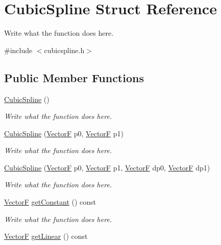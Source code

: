\hypertarget{structCubicSpline}{\section{Cubic\+Spline Struct Reference}
\label{structCubicSpline}
}


Write what the function does here.  




{\ttfamily \#include $<$cubicspline.\+h$>$}

\subsection*{Public Member Functions}
\begin{DoxyCompactItemize}
\item 
\hyperlink{structCubicSpline_a3eee74ae159c9473a6d15512ddc68d25}{Cubic\+Spline} ()
\begin{DoxyCompactList}\small\item\em Write what the function does here. \end{DoxyCompactList}\item 
\hyperlink{structCubicSpline_ae9889650db27305852f896d03d3bd75c}{Cubic\+Spline} (\hyperlink{structVectorF}{Vector\+F} p0, \hyperlink{structVectorF}{Vector\+F} p1)
\begin{DoxyCompactList}\small\item\em Write what the function does here. \end{DoxyCompactList}\item 
\hyperlink{structCubicSpline_a661fd0aed3df6744f52f5ba3872b9251}{Cubic\+Spline} (\hyperlink{structVectorF}{Vector\+F} p0, \hyperlink{structVectorF}{Vector\+F} p1, \hyperlink{structVectorF}{Vector\+F} dp0, \hyperlink{structVectorF}{Vector\+F} dp1)
\begin{DoxyCompactList}\small\item\em Write what the function does here. \end{DoxyCompactList}\item 
\hyperlink{structVectorF}{Vector\+F} \hyperlink{structCubicSpline_a87a1c29ab58b648430f45668067d7a1c}{get\+Constant} () const 
\begin{DoxyCompactList}\small\item\em Write what the function does here. \end{DoxyCompactList}\item 
\hyperlink{structVectorF}{Vector\+F} \hyperlink{structCubicSpline_ada872ef617b059ef68490e828bcdf181}{get\+Linear} () const 

\end{DoxyCompactItemize}

